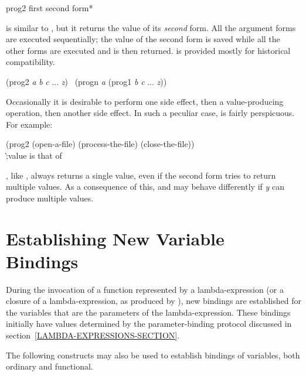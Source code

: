 \begin{defmac}
prog2 first second {form}*

 is similar to , but it returns the value of
its \emph{second} form.  All the argument forms are executed sequentially;
the value of the second form
is saved while all the other forms are executed and is then returned.
 is provided mostly for historical compatibility.
\begin{lisp}
(prog2 \emph{a} \emph{b} \emph{c} ... \emph{z}) \EQ\ (progn \emph{a} (prog1 \emph{b} \emph{c} ... \emph{z}))
\end{lisp}
Occasionally it is desirable to perform one side effect, then a value-producing
operation, then another side effect.  In such a peculiar case, 
is fairly perspicuous.
For example:
\begin{lisp}
(prog2 (open-a-file) (process-the-file) (close-the-file)) \\
\`;\textrm{value is that of }
\end{lisp}

, like ,
always returns a single value, even if the second form
tries to return multiple values.  As a consequence of this,
 and  may behave differently
if \emph{y} can produce multiple values.
\end{defmac}


\section{Establishing New Variable Bindings}
\label{VAR-BINDING-SECTION}

During the invocation of
a function represented by a lambda-expression (or a closure of
a lambda-expression, as produced by ),
new bindings are established for the variables that are the
parameters of the lambda-expression.  These bindings initially
have values determined by the parameter-binding protocol discussed
in section~\ref{LAMBDA-EXPRESSIONS-SECTION}.

The following constructs may also be used to establish bindings of variables,
both ordinary and functional.

